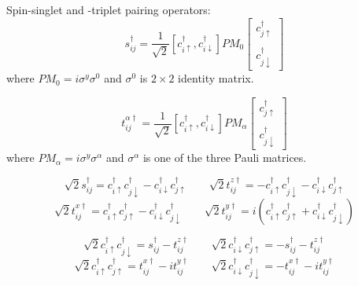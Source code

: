 \documentclass[12pt,a4paper]{article}
\newcommand{\create}[1] {
    c_{#1}^\dagger
}
\newcommand{\ppairing}[2] {
    c_{#1}^\dagger c_{#2}^\dagger
}
\newcommand{\spinup} {
    \uparrow
}
\newcommand{\spindown} {
	\downarrow
}
\begin{document}
Spin-singlet and -triplet pairing operators:
\begin{equation*}
    s_{ij}^\dagger = \frac{1}{\sqrt{2}}
    \left[\create{i\spinup}, \create{i\spindown} \right] PM_0
    \left[\begin{array}{c} \create{j\spinup} \\ \\ \create{j\spindown} \end{array} \right]
\end{equation*}
where $PM_0 = i\sigma^y \sigma^0$ and $\sigma^0$ is $2 \times 2$ identity matrix.

\begin{equation*}
    t_{ij}^{\alpha\dagger} = \frac{1}{\sqrt{2}}
    \left[\create{i\spinup}, \create{i\spindown} \right] PM_{\alpha}
    \left[\begin{array}{c} \create{j\spinup} \\ \\ \create{j\spindown} \end{array}\right]
\end{equation*}
where $PM_{\alpha} = i\sigma^y\sigma^{\alpha}$ and $\sigma^{\alpha}$ is one of the three Pauli matrices.

\begin{equation*}
    \sqrt{2} s_{ij}^\dagger = \ppairing{i\spinup}{j\spindown} - \ppairing{i\spindown}{j\spinup} \qquad
    \sqrt{2} t_{ij}^{z\dagger} = -\ppairing{i\spinup}{j\spindown} - \ppairing{i\spindown}{j\spinup}
\end{equation*}
\begin{equation*}
    \sqrt{2} t_{ij}^{x\dagger} = \ppairing{i\spinup}{j\spinup} - \ppairing{i\spindown}{j\spindown} \qquad
    \sqrt{2} t_{ij}^{y\dagger} = i \left(\ppairing{i\spinup}{j\spinup} + \ppairing{i\spindown}{j\spindown} \right)
\end{equation*}

\begin{equation*}
    \sqrt{2} \ppairing{i\spinup}{j\spindown} =  s_{ij}^\dagger - t_{ij}^{z\dagger} \qquad
    \sqrt{2} \ppairing{i\spindown}{j\spinup} = - s_{ij}^\dagger - t_{ij}^{z\dagger}
\end{equation*}
\begin{equation*}
    \sqrt{2} \ppairing{i\spinup}{j\spinup} =  t_{ij}^{x\dagger} - i t_{ij}^{y\dagger}\qquad
    \sqrt{2} \ppairing{i\spindown}{j\spindown} = - t_{ij}^{x\dagger} - i t_{ij}^{y\dagger}
\end{equation*}
\end{document}
